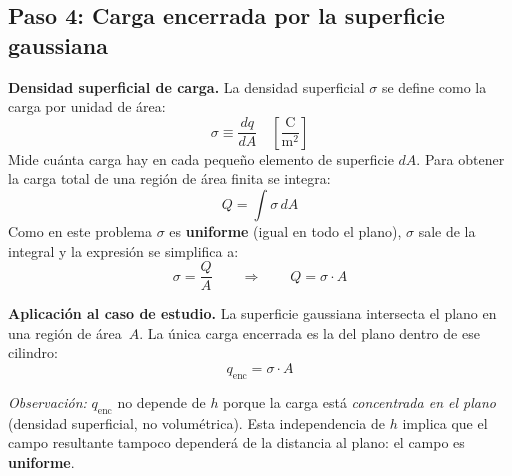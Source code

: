 \documentclass[12pt,letterpaper]{article}
\begin{document}
\bigskip

\subsection*{Paso 4: Carga encerrada por la superficie gaussiana}

\noindent
\begin{minipage}[c]{0.32\textwidth}
\centering
{}
\end{minipage}%
\hfill
\begin{minipage}[c]{0.65\textwidth}
\textbf{Densidad superficial de carga.}
La densidad superficial $\sigma$ se define como la carga por unidad de \'area:
\[
    \sigma \equiv \frac{dq}{dA}
    \quad \left[\frac{\text{C}}{\text{m}^2}\right]
\]
Mide cu\'anta carga hay en cada peque\~no elemento de superficie $dA$.
Para obtener la carga total de una regi\'on de \'area finita se integra:
\[
    Q = \int \sigma\, dA
\]
Como en este problema $\sigma$ es \textbf{uniforme} (igual en todo el plano),
$\sigma$ sale de la integral y la expresi\'on se simplifica a:
\[
    \sigma = \frac{Q}{A}
    \qquad\Longrightarrow\qquad
    Q = \sigma \cdot A
\]

\medskip
\textbf{Aplicaci\'on al caso de estudio.}
La superficie gaussiana intersecta el plano en una regi\'on de \'area~$A$.
La \'unica carga encerrada es la del plano dentro de ese cilindro:
\[
    q_\text{enc} = \sigma \cdot A
\]

\textit{Observaci\'on:} $q_\text{enc}$ no depende de $h$ porque la carga
est\'a \emph{concentrada en el plano} (densidad superficial, no volum\'etrica).
Esta independencia de $h$ implica que el campo resultante tampoco depender\'a
de la distancia al plano: el campo es \textbf{uniforme}.
\end{minipage}
\end{document}
